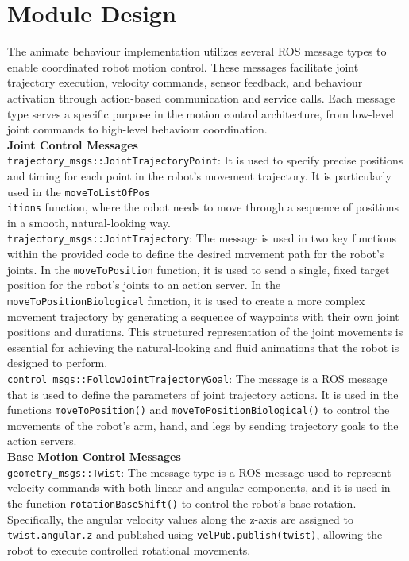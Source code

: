 \documentclass{CSSRforAfrica}
\begin{document}
\newpage
\section{Module Design}
The animate behaviour implementation utilizes several ROS message types to enable coordinated robot motion control. These messages facilitate joint trajectory execution, velocity commands, sensor feedback, and behaviour activation through action-based communication and service calls. Each message type serves a specific purpose in the motion control architecture, from low-level joint commands to high-level behaviour coordination.
\\[1em]
\textbf{Joint Control Messages}\\
\texttt{trajectory\_msgs::JointTrajectoryPoint}:  
It is used to specify precise positions and timing for each point in the robot's movement trajectory. It is particularly used in the \texttt{moveToListOfPos}\\
 \texttt{itions} function, where the robot needs to move through a sequence of positions in a smooth, natural-looking way.\\[1em]
\texttt{trajectory\_msgs::JointTrajectory}: The message is used in two key functions within the provided code to define the desired movement path for the robot's joints. In the \texttt{moveToPosition} function, it is used to send a single, fixed target position for the robot's joints to an action server. In the \texttt{moveToPositionBiological} function, it is used to create a more complex movement trajectory by generating a sequence of waypoints with their own joint positions and durations. This structured representation of the joint movements is essential for achieving the natural-looking and fluid animations that the robot is designed to perform.\\[1em]
\texttt{control\_msgs::FollowJointTrajectoryGoal}:  
The message is a ROS message that is used to define the parameters of joint trajectory actions. It is used in the functions \texttt{moveToPosition()} and \texttt{moveToPositionBiological()} to control the movements of the robot's arm, hand, and legs by sending trajectory goals to the action servers.
\\[1em]
\textbf{Base Motion Control Messages}\\
\texttt{geometry\_msgs::Twist}:  
The message type is a ROS message used to represent velocity commands with both linear and angular components, and it is used in the function \texttt{rotationBaseShift()} to control the robot's base rotation. Specifically, the angular velocity values along the z-axis are assigned to \texttt{twist.angular.z} and published using \texttt{velPub.publish(twist)}, allowing the robot to execute controlled rotational movements.
\end{document}
